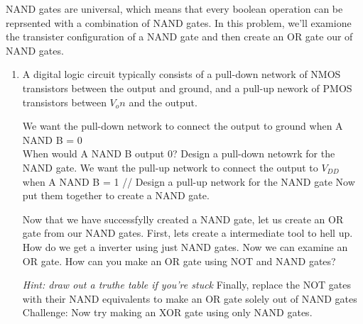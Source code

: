 
NAND gates are universal, which means that every boolean operation can be reprsented with a combination of NAND gates. In this problem, we'll examione the transister configuration of a NAND gate and then create an OR gate our of NAND gates. 

\begin{enumerate}
    \item A digital logic circuit typically consists of a pull-down network of NMOS transistors between the output and ground, and a pull-up nework of PMOS transistors between $V_on$ and the output. 
    \begin{enumerate}
        \qitem We want the pull-down network to connect the output to ground when A NAND B = 0 \\
        When would A NAND B output 0? Design a pull-down netowrk for the NAND gate. 
        \qitem We want the pull-up network to connect the output to $V_{DD}$ when A NAND B = 1 //
        Design a pull-up network for the NAND gate
        \sol{
        
        }
        \qitem Now put them together to create a NAND gate.
    \end{enumerate}
    Now that we have successfylly created a NAND gate, let us create an OR gate from our NAND gates. 
    \qitem First, lets create a intermediate tool to hell up. How do we get a inverter using just NAND gates.
    \qitem Now we can examine an OR gate. How can you make an OR gate using NOT and NAND gates?
    
    \emph{Hint: draw out a truthe table if you're stuck}
    \qitem Finally, replace the NOT gates with their NAND equivalents to make an OR gate solely out of NAND gates
    \qitem Challenge: Now try making an XOR gate using only NAND gates.
\end{enumerate}
